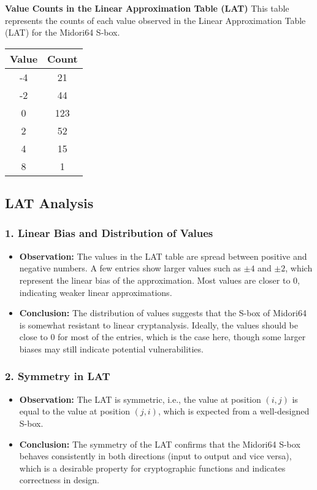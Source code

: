 \textbf{Value Counts in the Linear Approximation Table (LAT)}
This table represents the counts of each value observed in the Linear
Approximation Table (LAT) for the Midori64 S-box.

\begin{table}[h!]
	\centering
	\setlength{\tabcolsep}{5pt}
	\begin{tabular}{|c|c|}
		\hline
		\textbf{Value} & \textbf{Count} \\
		\hline
		-4             & 21             \\
		-2             & 44             \\
		0              & 123            \\
		2              & 52             \\
		4              & 15             \\
		8              & 1              \\
		\hline
	\end{tabular}
\end{table}

\subsection*{LAT Analysis}

\subsubsection*{1. Linear Bias and Distribution of Values}
\begin{itemize}
	\item \textbf{Observation:} The values in the LAT table are spread between
	      positive and negative numbers. A few entries show larger values such as $\pm
		      4$ and $\pm 2$, which represent the linear bias of the approximation. Most
	      values are closer to 0, indicating weaker linear approximations.
	\item \textbf{Conclusion:} The distribution of values suggests that the
	      S-box of Midori64 is somewhat resistant to linear cryptanalysis. Ideally,
	      the values should be close to 0 for most of the entries, which is the case
	      here, though some larger biases may still indicate potential
	      vulnerabilities.
\end{itemize}

\subsubsection*{2. Symmetry in LAT}
\begin{itemize}
	\item \textbf{Observation:} The LAT is symmetric, i.e., the value at
	      position $(i, j)$ is equal to the value at position $(j, i)$, which is
	      expected from a well-designed S-box.
	\item \textbf{Conclusion:} The symmetry of the LAT confirms that the
	      Midori64 S-box behaves consistently in both directions (input to output and
	      vice versa), which is a desirable property for cryptographic functions and
	      indicates correctness in design.
\end{itemize}


